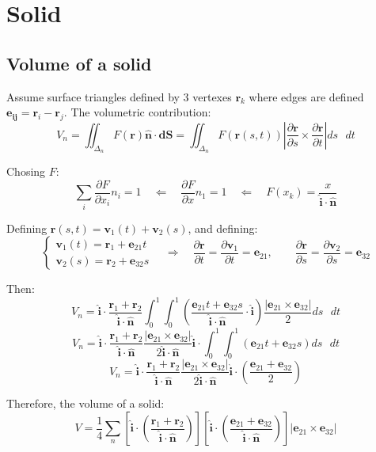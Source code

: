 \section{Solid}
\subsection{Volume of a solid}
Assume surface triangles defined by 3 vertexes $\mathbf r_k$ where edges are defined $\mathbf {e_{ij}} = \mathbf r_i - \mathbf r_j$. The volumetric contribution:
$$
V_n = \iint_{\Delta_n} F(\mathbf r)\mathbf{\hat n}\cdot\mathbf{dS} = 
\iint_{\Delta_n} F(\mathbf r(s, t))\left|\frac{\partial\mathbf r}{\partial s}\times\frac{\partial\mathbf r}{\partial t} \right| ds\mbox{ }dt
$$

Chosing $F$:
$$
\sum_i \frac{\partial F}{\partial x_i}n_i = 1 \quad\Longleftarrow\quad
\frac{\partial F}{\partial x}n_1 = 1 \quad\Longleftarrow\quad
F(x_k) = \frac{x}{\mathbf{\hat i}\cdot\mathbf{\hat n}}
$$


Defining $\mathbf r(s, t) = \mathbf v_1(t) + \mathbf v_2 (s)$, and defining:
\[
  \begin{cases}
   \mathbf v_1(t) = \mathbf r_1 + \mathbf e_{21}t  \\
   \mathbf v_2(s) = \mathbf r_2 + \mathbf e_{32}s
  \end{cases}
  \quad\Longrightarrow\quad
  \frac{\partial\mathbf r}{\partial t} = \frac{\partial\mathbf v_1}{\partial t} = \mathbf e_{21}, \quad\quad
  \frac{\partial\mathbf r}{\partial s} = \frac{\partial\mathbf v_2}{\partial s} = \mathbf e_{32}
\]

Then:
$$
V_n = \mathbf{\hat i}\cdot\frac{\mathbf r_1 + \mathbf r_2}{\mathbf{\hat i}\cdot\mathbf{\hat n}}
\int_0^1\int_0^1 \left(\frac{\mathbf e_{21}t + \mathbf e_{32}s}{\mathbf{\hat i}\cdot\mathbf{\hat n}}\cdot\mathbf{\hat i}\right) \frac{\left|\mathbf e_{21}\times\mathbf e_{32} \right|}{2} ds\mbox{ }dt
$$
$$
V_n = \mathbf{\hat i}\cdot\frac{\mathbf r_1 + \mathbf r_2}{\mathbf{\hat i}\cdot\mathbf{\hat n}} 
\frac{\left|\mathbf e_{21}\times\mathbf e_{32} \right|}{2 \mathbf{\hat i}\cdot\mathbf{\hat n}}\mathbf{\hat i}\cdot
\int_0^1\int_0^1 \left(\mathbf e_{21}t + \mathbf e_{32}s\right) ds\mbox{ }dt
$$
$$
V_n = \mathbf{\hat i}\cdot\frac{\mathbf r_1 + \mathbf r_2}{\mathbf{\hat i}\cdot\mathbf{\hat n}} 
\frac{\left|\mathbf e_{21}\times\mathbf e_{32} \right|}{2 \mathbf{\hat i}\cdot\mathbf{\hat n}}\mathbf{\hat i}\cdot
\left(\frac{\mathbf e_{21} + \mathbf e_{32}}{2}\right)
$$

Therefore, the volume of a solid:
$$
V =  \frac{1}{4} \sum_n
\left[ \mathbf{\hat i}\cdot \left( \frac{\mathbf r_1 + \mathbf r_2}{\mathbf{\hat i}\cdot\mathbf{\hat n}}\right) \right]
\left[ \mathbf{\hat i}\cdot \left( \frac{\mathbf e_{21} + \mathbf e_{32}}{\mathbf{\hat i}\cdot\mathbf{\hat n}}\right) \right]
\left|\mathbf e_{21}\times\mathbf e_{32} \right|
$$
